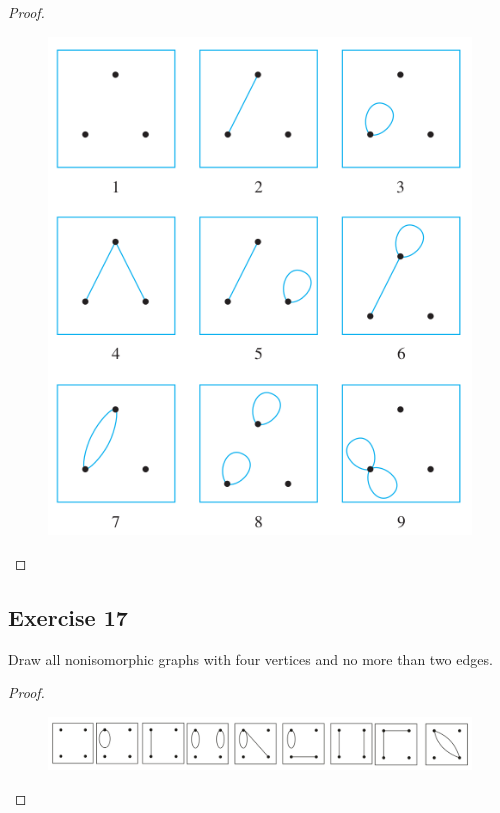 \documentclass[14pt]{extarticle}
\begin{document}
\begin{proof}
    \begin{figure}[ht!]
        \centering
        \includegraphics[scale=0.4]{../images/10.3.16.png}
    \end{figure}
\end{proof}

\subsection{Exercise 17}
Draw all nonisomorphic graphs with four vertices and no more than two edges.

\begin{proof}
    \begin{figure}[ht!]
        \centering
        \includegraphics[scale=0.3]{../images/10.3.17.png}
    \end{figure}
\end{proof}
\end{document}
